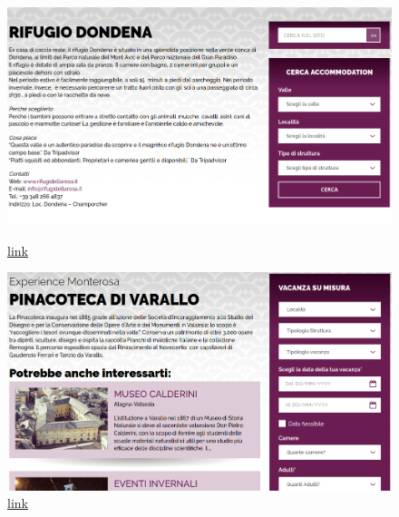 \documentclass[a4paper, 11pt, parskip=half, headsepline]{scrreprt}
\begin{document}
\begin{figure}[H]
    \begin{minipage}[t]{0.5\textwidth}
        \centering
        \includegraphics[width=1\linewidth, keepaspectratio]{101-consistency-missing-stuff}
        \caption{\href{https://www.visitmonterosa.com/accommodation/rifugio-dondena/}{link}}
        \label{fig:consistency-01}
    \end{minipage}   
    \hspace*{\fill}
    \begin{minipage}[t]{0.5\textwidth}
        \centering
        \includegraphics[width=1\linewidth, keepaspectratio]{102-consistency-missing-stuff}
        \caption{\href{https://www.visitmonterosa.com/experience/pinacoteca-di-varallo/}{link}}
        \label{fig:consistency-02}
    \end{minipage} 
\end{figure}
\end{document}
